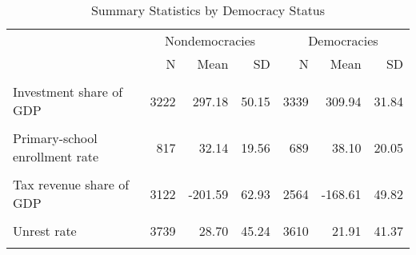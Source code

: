 \begin{table}[H]
\centering
\caption{\label{tab:unnamed-chunk-7}Summary Statistics by Democracy Status}
\centering
\begin{tabular}[t]{lrrrrrr}
\toprule
\multicolumn{1}{c}{ } & \multicolumn{3}{c}{Nondemocracies} & \multicolumn{3}{c}{Democracies} \\
\cmidrule(l{3pt}r{3pt}){2-4} \cmidrule(l{3pt}r{3pt}){5-7}
 & N & Mean & SD & N & Mean & SD\\
\midrule
\cellcolor{gray!10}{GDP per capita} & \cellcolor{gray!10}{3376} & \cellcolor{gray!10}{2074.46} & \cellcolor{gray!10}{3838.65} & \cellcolor{gray!10}{3558} & \cellcolor{gray!10}{8149.97} & \cellcolor{gray!10}{9334.83}\\
Investment share of GDP & 3222 & 297.18 & 50.15 & 3339 & 309.94 & 31.84\\
\cellcolor{gray!10}{Trade share of GDP} & \cellcolor{gray!10}{3175} & \cellcolor{gray!10}{406.06} & \cellcolor{gray!10}{67.95} & \cellcolor{gray!10}{3485} & \cellcolor{gray!10}{419.29} & \cellcolor{gray!10}{58.74}\\
Primary-school enrollment rate & 817 & 32.14 & 19.56 & 689 & 38.10 & 20.05\\
\cellcolor{gray!10}{Secondary-school enrollment rate} & \cellcolor{gray!10}{817} & \cellcolor{gray!10}{19.53} & \cellcolor{gray!10}{17.15} & \cellcolor{gray!10}{689} & \cellcolor{gray!10}{34.37} & \cellcolor{gray!10}{19.72}\\
\addlinespace
Tax revenue share of GDP & 3122 & -201.59 & 62.93 & 2564 & -168.61 & 49.82\\
\cellcolor{gray!10}{Child mortality per 1,000 births} & \cellcolor{gray!10}{4142} & \cellcolor{gray!10}{77.29} & \cellcolor{gray!10}{49.64} & \cellcolor{gray!10}{3615} & \cellcolor{gray!10}{33.26} & \cellcolor{gray!10}{32.65}\\
Unrest rate & 3739 & 28.70 & 45.24 & 3610 & 21.91 & 41.37\\
\cellcolor{gray!10}{Market reforms index (0–100)} & \cellcolor{gray!10}{3476} & \cellcolor{gray!10}{21.89} & \cellcolor{gray!10}{23.26} & \cellcolor{gray!10}{2829} & \cellcolor{gray!10}{52.11} & \cellcolor{gray!10}{24.75}\\
\bottomrule
\end{tabular}
\end{table}
